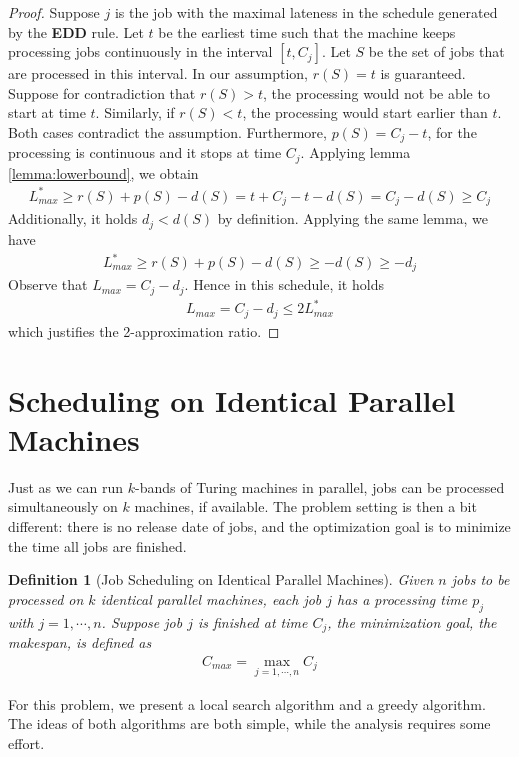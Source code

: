\documentclass[11pt,psfig,times]{article}
\newtheorem{definition}[theorem]{Definition}
\begin{document}
\begin{proof}
    Suppose $j$ is the job with the maximal lateness in the schedule generated by the \textbf{EDD} rule.
    Let $t$ be the earliest time such that the machine keeps processing jobs continuously in the interval $[t, C_j]$.
    Let $S$ be the set of jobs that are processed in this interval. In our assumption, $r(S) = t$ is guaranteed. 
    Suppose for contradiction that $r(S) > t$, the processing would not be able to start at time $t$. 
    Similarly, if $r(S) < t$, the processing would start earlier than $t$. Both cases contradict the assumption.
    Furthermore, $p(S) = C_j - t$, for the processing is continuous and it stops at time $C_j$. Applying lemma \cref{lemma:lowerbound},
    we obtain 
    \begin{align*}
        L_{max}^* \geq r(S) + p(S) - d(S) = t + C_j - t - d(S) = C_j - d(S) \geq C_j
    \end{align*}
    Additionally, it holds $d_j < d(S)$ by definition. Applying the same lemma, we have
    \begin{align*}
        L_{max}^* \geq r(S) + p(S) - d(S) \geq -d(S) \geq -d_j
    \end{align*}
    Observe that $L_{max} = C_j - d_j$. Hence in this schedule, it holds 
    \begin{align*}
        L_{max} = C_j - d_j \leq 2L_{max}^*
    \end{align*}
    which justifies the 2-approximation ratio.
\end{proof}

\section{Scheduling on Identical Parallel Machines}
Just as we can run $k$-bands of Turing machines in parallel, jobs can be processed simultaneously on 
$k$ machines, if available. The problem setting is then a bit different: there is no release date of jobs, and 
the optimization goal is to minimize the time all jobs are finished. 
\begin{definition}[Job Scheduling on Identical Parallel Machines]
    Given $n$ jobs to be processed on $k$ identical parallel machines, each job $j$ has a processing time $p_j$ with $j = 1, \cdots, n$.
    Suppose job $j$ is finished at time $C_j$, the minimization goal, the makespan, is defined as
    \begin{align*}
        C_{max} = \max_{j = 1, \cdots, n} C_j
    \end{align*}
\end{definition}
For this problem, we present a local search algorithm and a greedy algorithm. The ideas of both algorithms 
are both simple, while the analysis requires some effort. 
\end{document}

